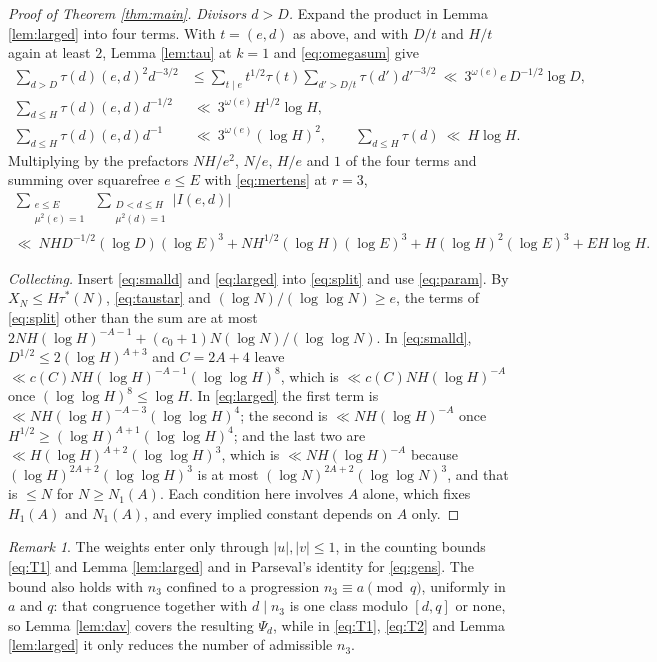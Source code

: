 \documentclass[11pt,a4paper]{article}
\theoremstyle{plain}
\theoremstyle{remark}
\newtheorem{remark}[theorem]{Remark}
\newcommand{\lcm}[1]{[#1]}
\newcommand{\taustar}{\tau^{*}}
\begin{document}
\begin{proof}[Proof of Theorem \ref{thm:main}]
\emph{Divisors $d>D$.} Expand the product in Lemma \ref{lem:larged} into four terms. With $t=(e,d)$
as above, and with $D/t$ and $H/t$ again at least $2$, Lemma \ref{lem:tau} at $k=1$ and
\eqref{eq:omegasum} give
\begin{align*}
  \sum_{d>D}\tau(d)(e,d)^{2}d^{-3/2}
    &\le\sum_{t\mid e}t^{1/2}\tau(t)\sum_{d'>D/t}\tau(d')d'^{-3/2}
     \ \ll\ 3^{\omega(e)}e\,D^{-1/2}\log D,\\
  \sum_{d\le H}\tau(d)(e,d)d^{-1/2}&\ \ll\ 3^{\omega(e)}H^{1/2}\log H,\\
  \sum_{d\le H}\tau(d)(e,d)d^{-1}&\ \ll\ 3^{\omega(e)}(\log H)^{2},\qquad
  \sum_{d\le H}\tau(d)\ \ll\ H\log H.
\end{align*}
Multiplying by the prefactors $NH/e^{2}$, $N/e$, $H/e$ and $1$ of the four terms and summing over
squarefree $e\le E$ with \eqref{eq:mertens} at $r=3$,
\begin{multline}\label{eq:larged}
  \sum_{\substack{e\le E\\ \mu^{2}(e)=1}}\ \sum_{\substack{D<d\le H\\ \mu^{2}(d)=1}}|I(e,d)|\\
  \ll\ NHD^{-1/2}(\log D)(\log E)^{3}+NH^{1/2}(\log H)(\log E)^{3}
   +H(\log H)^{2}(\log E)^{3}+EH\log H .
\end{multline}

\emph{Collecting.} Insert \eqref{eq:smalld} and \eqref{eq:larged} into \eqref{eq:split} and use
\eqref{eq:param}. By $X_N\le H\taustar(N)$, \eqref{eq:taustar} and $(\log N)/(\log\log N)\ge e$, the
terms of \eqref{eq:split} other than the sum are at most
$2NH(\log H)^{-A-1}+(c_0+1)N(\log N)/(\log\log N)$. In \eqref{eq:smalld},
$D^{1/2}\le 2(\log H)^{A+3}$ and $C=2A+4$ leave $\ll c(C)NH(\log H)^{-A-1}(\log\log H)^{8}$, which is
$\ll c(C)NH(\log H)^{-A}$ once $(\log\log H)^{8}\le\log H$. In \eqref{eq:larged} the first term is
$\ll NH(\log H)^{-A-3}(\log\log H)^{4}$; the second is $\ll NH(\log H)^{-A}$ once
$H^{1/2}\ge(\log H)^{A+1}(\log\log H)^{4}$; and the last two are
$\ll H(\log H)^{A+2}(\log\log H)^{3}$, which is $\ll NH(\log H)^{-A}$ because
$(\log H)^{2A+2}(\log\log H)^{3}$ is at most $(\log N)^{2A+2}(\log\log N)^{3}$, and that is $\le N$
for $N\ge N_1(A)$. Each condition here involves $A$ alone, which fixes $H_1(A)$ and $N_1(A)$, and
every implied constant depends on $A$ only.
\end{proof}

\begin{remark}\label{rem:weights}
The weights enter only through $|u|,|v|\le1$, in the counting bounds \eqref{eq:T1} and
Lemma \ref{lem:larged} and in Parseval's identity for \eqref{eq:gens}. The bound also holds with
$n_3$ confined to a progression $n_3\equiv a\pmod q$, uniformly in $a$ and $q$: that congruence
together with $d\mid n_3$ is one class modulo $\lcm{d,q}$ or none, so Lemma \ref{lem:dav} covers the
resulting $\Psi_d$, while in \eqref{eq:T1}, \eqref{eq:T2} and Lemma \ref{lem:larged} it only reduces
the number of admissible $n_3$.
\end{remark}
\end{document}
